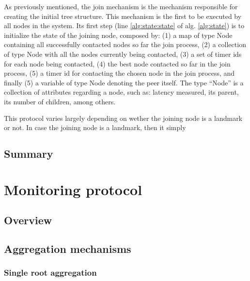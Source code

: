 As previously mentioned, the join mechanism is the mechanism responsible for creating the initial tree structure. This mechanism is the first to be executed by all nodes in the system. Its first step (line \ref{alg:state:state} of alg. \ref{alg:state}) is to initialize the state of the joining node, composed by: (1) a map of type Node containing all successfully contacted nodes so far the join process, (2) a collection of type Node with all the nodes currently being contacted, (3) a set of timer ids for each node being contacted, (4) the best node contacted so far in the join process, (5) a timer id for contacting the chosen node in the join process, and finally (5) a variable of type Node denoting the peer itself. The type ``Node'' is a collection of attributes regarding a node, such as: latency measured, its parent, its number of children, among others.





This protocol varies largely depending on wether the joining node is a landmark or not. In case the joining node is a landmark, then it simply 







\subsection{Summary}

\section{Monitoring protocol}

\subsection{Overview}

\subsection{Aggregation mechanisms}

\subsubsection{Single root aggregation}


